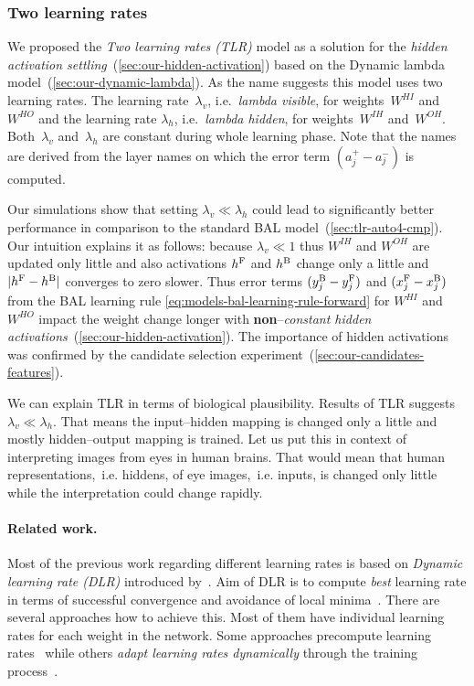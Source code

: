 
\subsubsection{Two learning rates} 
\label{sec:our-tlr}

We proposed the \emph{Two learning rates (TLR)} model as a solution for the \emph{hidden activation settling}~(\ref{sec:our-hidden-activation}) based on the Dynamic lambda model~(\ref{sec:our-dynamic-lambda}). As the name suggests this model uses two learning rates. The learning rate~$\lambda_v$, i.e.~\emph{lambda visible}, for weights~$W^{HI}$ and~$W^{HO}$ and the learning rate $\lambda_h$, i.e.~\emph{lambda hidden}, for weights~$W^{IH}$ and~$W^{OH}$. Both~$\lambda_v$ and~$\lambda_h$ are constant during whole learning phase. Note that the names are derived from the layer names on which the error term $(a^{+}_j - a^{-}_j)$ is computed. 

Our simulations show that setting $\lambda_v \ll \lambda_h$ could lead to significantly better performance in comparison to the standard BAL model~(\ref{sec:tlr-auto4-cmp}). Our intuition explains it as follows: because $\lambda_v \ll 1$ thus $W^{IH}$ and $W^{OH}$ are updated only little and also activations $h^{\rm F}$ and $h^{\rm B}$ change only a little and $|h^{\rm F}- h^{\rm B}|$ converges to zero slower. Thus error terms $(y_j^{\rm B} - y_j^{\rm F})$ and $(x_j^{\rm F} - x_j^{\rm B})$ from the BAL learning rule \ref{eq:models-bal-learning-rule-forward} for $W^{HI}$ and $W^{HO}$ impact the weight change longer with {\bf non}--\emph{constant hidden activations}~(\ref{sec:our-hidden-activation}). The importance of hidden activations was confirmed by the candidate selection experiment~(\ref{sec:our-candidates-features}). 

We can explain TLR in terms of biological plausibility. Results of TLR suggests $\lambda_v \ll \lambda_h$. That means the input--hidden mapping is changed only a little and mostly hidden--output mapping is trained. Let us put this in context of interpreting images from eyes in human brains. That would mean that human representations,~i.e. hiddens, of eye images,~i.e. inputs, is changed only little while the interpretation could change rapidly. 

\paragraph{Related work.} 
\label{sec:our-tlr-related-work}
Most of the previous work regarding different learning rates is based on \emph{Dynamic learning rate (DLR)} introduced by~\citet{jacobs1988increased}. Aim of DLR is to compute \emph{best} learning rate in terms of successful convergence and avoidance of local minima~\citep{behera2006adaptive}. There are several approaches how to achieve this. Most of them have individual learning rates for each weight in the network. Some approaches precompute learning rates~\citep{weir1991method} while others \emph{adapt learning rates dynamically} through the training process~\citep{yu1997efficient, magoulas1999improving, yu2002backpropagation}.

